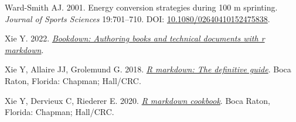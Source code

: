 \documentclass[fleqn,10pt]{wlpeerj} %
\newlength{\cslhangindent}
\newlength{\cslentryspacingunit} %
\newenvironment{CSLReferences}[2] %
 {%
  \setlength{\parindent}{0pt}
  \ifodd #1
  \let\oldpar\par
  \def\par{\hangindent=\cslhangindent\oldpar}
  \fi
  \setlength{\parskip}{#2\cslentryspacingunit}
 }%
 {}
\begin{document}
\begin{CSLReferences}{1}{0}
\leavevmode{}%
Ward-Smith AJ. 2001. Energy conversion strategies during 100 m sprinting. \emph{Journal of Sports Sciences} 19:701--710. DOI: \href{https://doi.org/10.1080/02640410152475838}{10.1080/02640410152475838}.

\leavevmode{}%
Xie Y. 2022. \emph{\href{https://CRAN.R-project.org/package=bookdown}{Bookdown: Authoring books and technical documents with r markdown}}.

\leavevmode{}%
Xie Y, Allaire JJ, Grolemund G. 2018. \emph{\href{https://bookdown.org/yihui/rmarkdown}{R markdown: The definitive guide}}. Boca Raton, Florida: Chapman; Hall/CRC.

\leavevmode{}%
Xie Y, Dervieux C, Riederer E. 2020. \emph{\href{https://bookdown.org/yihui/rmarkdown-cookbook}{R markdown cookbook}}. Boca Raton, Florida: Chapman; Hall/CRC.

\end{CSLReferences}
\end{document}
